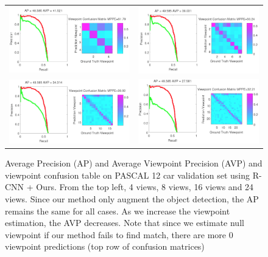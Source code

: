 \documentclass[10pt,twocolumn,letterpaper]{article}
\begin{document}
\begin{figure}[h]
\setlength\tabcolsep{1pt}
\centering
\begin{tabular}{cc}
  \hline
  \includegraphics[width=0.49\linewidth]{car_cnn4_crop.png} &   
  \includegraphics[width=0.49\linewidth]{car_cnn8_crop.png} \\   
  \includegraphics[width=0.49\linewidth]{car_cnn16_crop.png} &   
  \includegraphics[width=0.49\linewidth]{car_cnn24_crop.png} \\   
  \hline
\end{tabular}
\caption{Average Precision (AP) and Average Viewpoint Precision (AVP) and viewpoint confusion table on PASCAL 12 car validation set using R-CNN + Ours. From the top left, 4 views, 8 views, 16 views and 24 views. Since our method only augment the object detection, the AP remains the same for all cases. As we increase the viewpoint estimation, the AVP decreases. Note that since we estimate null viewpoint if our method fails to find match, there are more 0 viewpoint predictions (top row of confusion matrices) }
  \label{fig:car_cnn_ap}
\end{figure}
\end{document}
